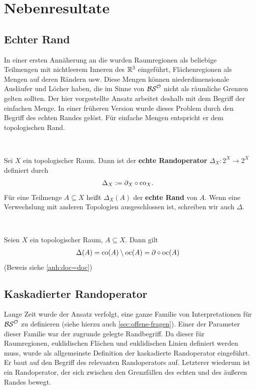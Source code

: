 \chapter{Nebenresultate}\label{chap:nebenresultat}

\section{Echter Rand}\label{sec:echter-rand}
    In einer ersten Annäherung an die \strukt wurden Raumregionen als beliebige Teilmengen mit nichtleerem Inneren des $\mathbb{R}^3$ eingeführt, Flächenregionen als Mengen auf deren Rändern usw.
    Diese Mengen können niederdimensionale Ausläufer und Löcher haben, die im Sinne von $\mathcal{BS}^{\mathcal{O}}$ nicht als räumliche Grenzen gelten sollten. 
    Der hier vorgestellte Ansatz arbeitet deshalb mit dem Begriff der einfachen Menge. 
    In einer früheren Version wurde dieses Problem durch den Begriff des echten Randes gelöst.
    Für einfache Mengen entspricht er dem topologischen Rand.

    \begin{dfn}\label{def:echtR} \ \vspace{8pt}

        \noindent
        Sei $X$ ein topologischer Raum. Dann ist der \textbf{echte Randoperator} $\Delta_X : 2^X \to 2^X$ definiert durch
        \begin{align*}
            \Delta_X := \partial_X \circ \text{co}_X.
        \end{align*}
        Für eine Teilmenge $A \subseteq X$ heißt $\Delta_X(A)$ der \textbf{echte Rand} von $A$. Wenn eine Verwechslung mit anderen Topologien ausgeschlossen ist, schreiben wir auch $\Delta$.
        
    \end{dfn}

    \begin{satz} \label{satz:dco=doc} \ \vspace{8pt}

        \noindent
        Seien $X$ ein topologischer Raum, $A \subseteq X$. Dann gilt
        \begin{align*}
            \Delta(A) = \text{co}(A) \setminus \text{oc}(A) = \partial \circ \text{oc}(A)
        \end{align*}
        (Beweis siehe \ref{anh:doc=doc})
    \end{satz}
    
    
\section{Kaskadierter Randoperator}\label{sec:kaskadierter-ro}
    Lange Zeit wurde der Ansatz verfolgt, eine ganze Familie von Interpretationen für $\mathcal{BS}^{\mathcal{O}}$ zu definieren (siehe hierzu auch \ref{sec:offene-fragen}).
    Einer der Parameter dieser Familie war der zugrunde gelegte Randbegriff.
    Da dieser für Raumregionen, euklidischen Flächen und euklidischen Linien definiert werden muss, wurde als allgemeinste Definition der kaskadierte Randoperator eingeführt.
    Er baut auf den Begriff des relevanten Randoperators auf.
    Letzterer wiederum ist ein Randoperator, der sich zwischen den Grenzfällen des echten und des äußeren Randes bewegt.
    
